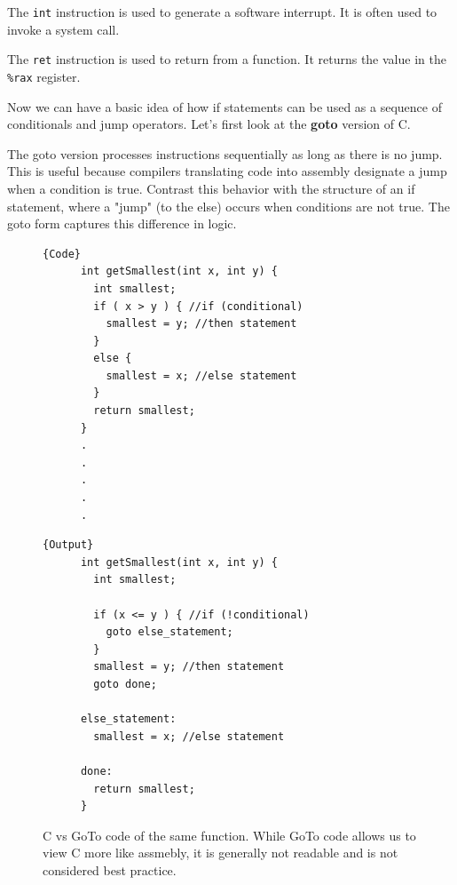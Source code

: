 \documentclass{article}
\begin{document}
  \begin{definition}[int]
    The \texttt{int} instruction is used to generate a software interrupt. It is often used to invoke a system call.
  \end{definition}

  \begin{definition}[ret]
    The \texttt{ret} instruction is used to return from a function. It returns the value in the \texttt{\%rax} register. 
  \end{definition}

  Now we can have a basic idea of how if statements can be used as a sequence of conditionals and jump operators. Let's first look at the \textbf{goto} version of C. 

  \begin{definition}
    The goto version processes instructions sequentially as long as there is no jump. This is useful because compilers translating code into assembly designate a jump when a condition is true. Contrast this behavior with the structure of an if statement, where a "jump" (to the else) occurs when conditions are not true. The goto form captures this difference in logic.
  \end{definition}

  \begin{figure}[H]
    \centering 
    \noindent\begin{minipage}{.5\textwidth}
    \begin{lstlisting}[]{Code}
      int getSmallest(int x, int y) {
        int smallest;
        if ( x > y ) { //if (conditional)
          smallest = y; //then statement
        }
        else {
          smallest = x; //else statement
        }
        return smallest;
      }
      .
      .
      .
      .
      .
    \end{lstlisting}
    \end{minipage}
    \hfill
    \begin{minipage}{.49\textwidth}
    \begin{lstlisting}[]{Output}
      int getSmallest(int x, int y) {
        int smallest;

        if (x <= y ) { //if (!conditional)
          goto else_statement;
        }
        smallest = y; //then statement
        goto done;

      else_statement:
        smallest = x; //else statement

      done:
        return smallest;
      }      
    \end{lstlisting}
    \end{minipage}
    \caption{C vs GoTo code of the same function. While GoTo code allows us to view C more like assmebly, it is generally not readable and is not considered best practice. } 
    \label{fig:c_vs_goto}
  \end{figure}
\end{document}
